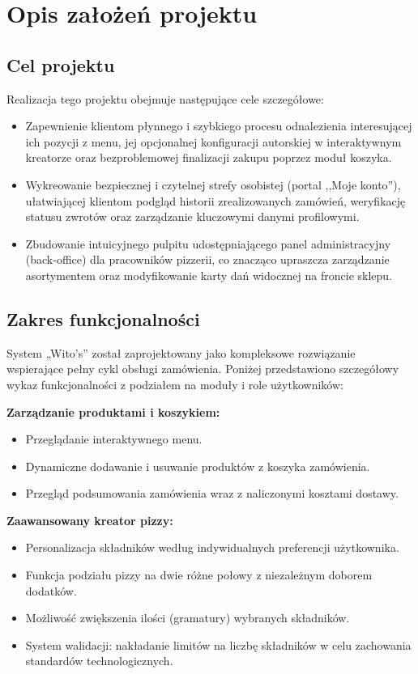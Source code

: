 \chapter{Opis założeń projektu}
\section{Cel projektu}

Realizacja tego projektu obejmuje następujące cele szczegółowe:
\begin{itemize}
    \item Zapewnienie klientom płynnego i szybkiego procesu odnalezienia interesującej ich pozycji z menu, jej opcjonalnej konfiguracji autorskiej w interaktywnym kreatorze oraz bezproblemowej finalizacji zakupu poprzez moduł koszyka.
    \item Wykreowanie bezpiecznej i czytelnej strefy osobistej (portal ,,Moje konto''), ułatwiającej klientom podgląd historii zrealizowanych zamówień, weryfikację statusu zwrotów oraz zarządzanie kluczowymi danymi profilowymi.
    \item Zbudowanie intuicyjnego pulpitu udostępniającego panel administracyjny (back-office) dla pracowników pizzerii, co znacząco upraszcza zarządzanie asortymentem oraz modyfikowanie karty dań widocznej na froncie sklepu.
\end{itemize}

\section{Zakres funkcjonalności}
System „Wito’s” został zaprojektowany jako kompleksowe rozwiązanie wspierające pełny cykl obsługi zamówienia. Poniżej przedstawiono szczegółowy wykaz funkcjonalności z podziałem na moduły i role użytkowników:
\vspace{10pt}

\textbf{Zarządzanie produktami i koszykiem:}
\begin{itemize}
\item Przeglądanie interaktywnego menu.
\item Dynamiczne dodawanie i usuwanie produktów z koszyka zamówienia.
\item Przegląd podsumowania zamówienia wraz z naliczonymi kosztami dostawy.
\end{itemize}
    
\textbf{Zaawansowany kreator pizzy:}
\begin{itemize}
\item Personalizacja składników według indywidualnych preferencji użytkownika.
\item Funkcja podziału pizzy na dwie różne połowy z niezależnym doborem
dodatków.
\item Możliwość zwiększenia ilości (gramatury) wybranych składników.
\item System walidacji: nakładanie limitów na liczbę składników w celu zachowania standardów technologicznych.
\end{itemize}
    
